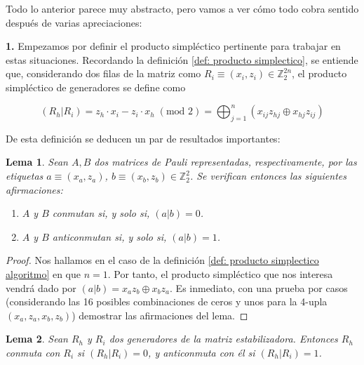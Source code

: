 \documentclass[11pt,a4paper,twoside,pdf]{article}
\numberwithin{equation}{section}
\newtheorem{lemma}{Lema}
\begin{document}
	\noindent Todo lo anterior parece muy abstracto, pero vamos a ver cómo todo cobra sentido después de varias  apreciaciones:
		
	\noindent \textbf{1. } Empezamos por definir el producto simpléctico pertinente para trabajar en estas situaciones. Recordando la definición \ref{def: producto simplectico}, se entiende que, considerando dos filas de la matriz como $R_i \equiv (x_i,z_i) \in \mathbb{Z}_2^{2n}$, el producto simpléctico de generadores se define como
		
		\begin{equation} \label{def: producto simplectico algoritmo}
			(R_h|R_i) = z_h \cdot x_i - z_i \cdot x_h \; (\text{mod }2) = 
								\displaystyle\bigoplus_{j=1}^n (x_{ij}z_{hj} \oplus x_{hj}z_{ij})
		\end{equation}
		
	De esta definición se deducen un par de resultados importantes:
		
		\begin{lemma} \label{lema: conmutacion matrices}
			Sean $A,B$ dos matrices de Pauli representadas, respectivamente, por las etiquetas $a\equiv(x_a,z_a)$, $b\equiv(x_b,z_b)\in \mathbb{Z}^2_2$. Se verifican entonces las siguientes afirmaciones:
			\begin{enumerate} [label=(\roman*),itemsep=1pt]
				\item $A$ y $B$ conmutan si, y solo si, $(a|b)=0$.
				\item $A$ y $B$ anticonmutan si, y solo si, $(a|b)=1$.
			\end{enumerate}
		\end{lemma}
		
		\begin{proof}
			Nos hallamos en el caso de la definición \ref{def: producto simplectico algoritmo} en que $n=1$.
			Por tanto, el producto simpléctico que nos interesa vendrá dado por $(a|b)=x_az_b\oplus x_bz_a$. Es inmediato, con una prueba por casos (considerando las 16 posibles combinaciones de ceros y unos para la 4-upla $(x_a,z_a,x_b,z_b)$) demostrar las afirmaciones del lema.
		\end{proof}	
		
		\begin{lemma}\label{lema: conmutacion generadores}
			Sean $R_h$ y $R_i$ dos generadores de la matriz estabilizadora. Entonces $R_h$ conmuta con $R_i$ si $(R_h|R_i)=0$, y anticonmuta con él si $(R_h|R_i)=1$.
		\end{lemma}
		
\end{document}
